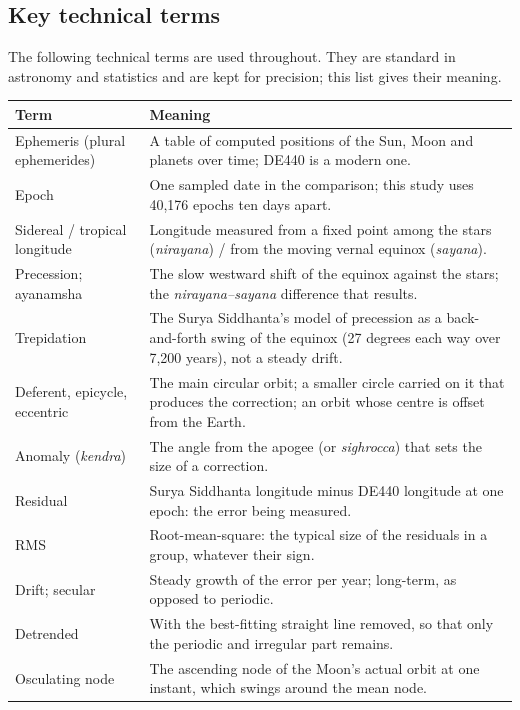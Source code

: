 \documentclass[11pt,a4paper]{article}
\newcommand{\toprule}{\hline\hline}%
\newcommand{\midrule}{\hline}%
\begin{document}
\subsection{Key technical terms}
\label{sec:glossary}

The following technical terms are used throughout. They are standard in astronomy and statistics and are kept for precision; this list gives their meaning.

{\small
\begin{longtable}{@{}>{\raggedright\arraybackslash}p{}>{\raggedright\arraybackslash}p{}@{}}
\toprule
Term & Meaning \\
\midrule
\endhead
Ephemeris (plural ephemerides) & A table of computed positions of the Sun, Moon and planets over time; DE440 is a modern one. \\
Epoch & One sampled date in the comparison; this study uses 40,176 epochs ten days apart. \\
Sidereal / tropical longitude & Longitude measured from a fixed point among the stars (\textit{nirayana}) / from the moving vernal equinox (\textit{sayana}). \\
Precession; ayanamsha & The slow westward shift of the equinox against the stars; the \textit{nirayana--sayana} difference that results. \\
Trepidation & The Surya Siddhanta's model of precession as a back-and-forth swing of the equinox (27 degrees each way over 7,200 years), not a steady drift. \\
Deferent, epicycle, eccentric & The main circular orbit; a smaller circle carried on it that produces the correction; an orbit whose centre is offset from the Earth. \\
Anomaly (\textit{kendra}) & The angle from the apogee (or \textit{sighrocca}) that sets the size of a correction. \\
Residual & Surya Siddhanta longitude minus DE440 longitude at one epoch: the error being measured. \\
RMS & Root-mean-square: the typical size of the residuals in a group, whatever their sign. \\
Drift; secular & Steady growth of the error per year; long-term, as opposed to periodic. \\
Detrended & With the best-fitting straight line removed, so that only the periodic and irregular part remains. \\
Osculating node & The ascending node of the Moon's actual orbit at one instant, which swings around the mean node. \\

\end{longtable}}
\end{document}
